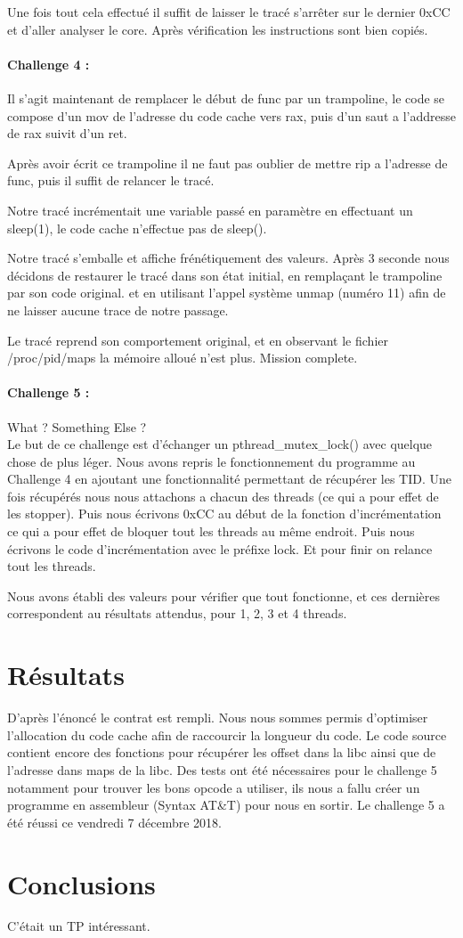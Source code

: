 \documentclass[12pt]{article}
\begin{document}
Une fois tout cela effectué il suffit de laisser le tracé s'arrêter sur le dernier 0xCC et d'aller analyser le core.
Après vérification les instructions sont bien copiés. 

\paragraph{Challenge 4 :}

Il s'agit maintenant de remplacer le début de func par un trampoline, le code se compose d'un mov de l'adresse du code cache vers rax,
puis d'un saut a l'addresse de rax suivit d'un ret.

Après avoir écrit ce trampoline il ne faut pas oublier de mettre rip a l'adresse de func, puis il suffit de relancer le tracé.

Notre tracé incrémentait une variable passé en paramètre en effectuant un sleep(1), le code cache n'effectue pas de sleep().

Notre tracé s'emballe et affiche frénétiquement des valeurs.
Après 3 seconde nous décidons de restaurer le tracé dans son état initial, en remplaçant le trampoline par son code original. et en utilisant l'appel système unmap (numéro 11) afin de ne laisser aucune trace de notre passage.

Le tracé reprend son comportement original, et en observant le fichier /proc/pid/maps la mémoire alloué n'est plus.
Mission complete.

\paragraph{Challenge 5 :}

What ? Something Else ?\\
Le but de ce challenge est d'échanger un pthread\_mutex\_lock() avec quelque chose de plus léger.
Nous avons repris le fonctionnement du programme au Challenge 4 en ajoutant une fonctionnalité permettant de récupérer les TID.
Une fois récupérés nous nous attachons a chacun des threads (ce qui a pour effet de les stopper).
Puis nous écrivons 0xCC au début de la fonction d'incrémentation ce qui a pour effet de bloquer tout les threads au même endroit.
Puis nous écrivons le code d'incrémentation avec le préfixe lock.
Et pour finir on relance tout les threads.

Nous avons établi des valeurs pour vérifier que tout fonctionne, et ces dernières correspondent au résultats attendus,
pour 1, 2, 3 et 4 threads.

\section{Résultats}
D'après l'énoncé le contrat est rempli. Nous nous sommes permis d'optimiser l'allocation du code cache afin de raccourcir la longueur du code.
Le code source contient encore des fonctions pour récupérer les offset dans la libc ainsi que de l'adresse dans maps de la libc.
Des tests ont été nécessaires pour le challenge 5 notamment pour trouver les bons opcode a utiliser,
ils nous a fallu créer un programme en assembleur (Syntax AT\&T) pour nous en sortir.
Le challenge 5 a été réussi ce vendredi 7 décembre 2018.


\section{Conclusions}
C'était un TP intéressant.
\end{document}
